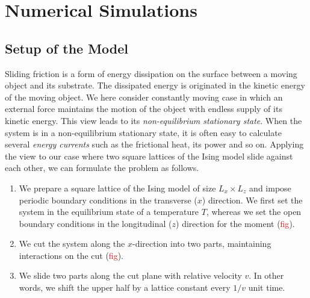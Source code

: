 \chapter{Numerical Simulations}\label{chap:NumSim}

\section{Setup of the Model}

Sliding friction is a form of energy dissipation on the surface between a moving object and its substrate. The dissipated energy is originated in the kinetic energy of the moving object. We here consider constantly moving case in which an external force maintains the motion of the object with endless supply of its kinetic energy. This view leads to its \textit{non-equilibrium stationary state}. When the system is in a non-equilibrium stationary state, it is often easy to calculate several \textit{energy currents} such as the frictional heat, its power and so on. Applying the view to our case where two square lattices of the Ising model slide against each other, we can formulate the problem as follows.
\begin{enumerate}
	\item We prepare a square lattice of the Ising model of size $L_{x}\times L_{z}$ and impose periodic boundary conditions in the transverse ($x$) direction. We first set the system in the equilibrium state of a temperature $T$, whereas we set the open boundary conditions in the longitudinal ($z$) direction for the moment (\textcolor{red}{fig}).
	\item We cut the system along the $x$-direction into two parts, maintaining interactions on the cut (\textcolor{red}{fig}).
	\item We slide two parts along the cut plane with relative velocity $v$. In other words, we shift the upper half by a lattice constant every $1/v$ unit time. 
\end{enumerate}
\vspace{5.0\baselineskip}

